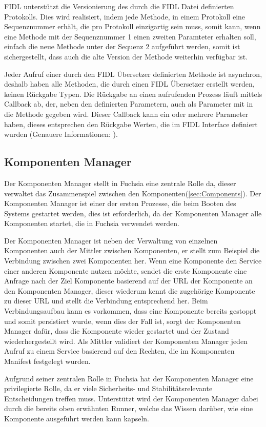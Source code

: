 \documentclass[a4paper]{scrartcl}
\begin{document}
FIDL unterstützt die Versionierung des durch die FIDL Datei definierten Protokolls. Dies wird realisiert, indem jede Methode, in einem Protokoll eine Sequenznummer erhält, die pro Protokoll einzigartig sein muss, somit kann, wenn eine Methode mit der Sequenznummer 1 einen zweiten Paramteter erhalten soll, einfach die neue Methode unter der Sequenz 2 aufgeführt werden, somit ist sichergestellt, dass auch die alte Version der Methode weiterhin verfügbar ist. \cite{Fuchsia.FIDL.Tutorial}

Jeder Aufruf einer durch den FIDL Übersetzer definierten Methode ist asynchron, deshalb haben alle Methoden, die durch einen FIDL Übersetzer erstellt werden, keinen Rückgabe Typen. Die Rückgabe an einen aufrufenden Prozess läuft mittels Callback ab, der, neben den definierten Parametern, auch als Parameter mit in die Methode gegeben wird. Dieser Callback kann ein oder mehrere Parameter haben, dieses entsprechen den Rückgabe Werten, die im FIDL Interface definiert wurden (Genauere Informationen: \cite{Fuchsia.FIDL.Tutorial}).
\subsection{Komponenten Manager}
Der Komponenten Manager stellt in Fuchsia eine zentrale Rolle da, dieser verwaltet das Zusammenspiel zwischen den Komponenten(\ref{sec:Components}). Der Komponenten Manager ist einer der ersten Prozesse, die beim Booten des Systems gestartet werden, dies ist erforderlich, da der Komponenten Manager alle Komponenten startet, die in Fuchsia verwendet werden.

Der Komponenten Manager ist neben der Verwaltung von einzelnen Komponenten auch der Mittler zwischen Komponenten, er stellt zum Beispiel die Verbindung zwischen zwei Komponenten her. Wenn eine Komponente den Service einer anderen Komponente nutzen möchte, sendet die erste Komponente eine Anfrage nach der Ziel Komponente basierend auf der URL der Komponente an den Komponenten Manager, dieser wiederum kennt die zugehörige Komponente zu dieser URL und stellt die Verbindung entsprechend her. Beim Verbindungsaufbau kann es vorkommen, dass eine Komponente bereits gestoppt und somit persistiert wurde, wenn dies der Fall ist, sorgt der Komponenten Manager dafür, dass die Komponente wieder gestartet und der Zustand wiederhergestellt wird. Als Mittler validiert der Komponenten Manager jeden Aufruf zu einem Service basierend auf den Rechten, die im Komponenten Manifest festgelegt wurden.

Aufgrund seiner zentralen Rolle in Fuchsia hat der Komponenten Manager eine privilegierte Rolle, da er viele Sicherheits- und Stabilitätsrelevante Entscheidungen treffen muss. Unterstützt wird der Komponenten Manager dabei durch die bereits oben erwähnten Runner, welche das Wissen darüber, wie eine Komponente ausgeführt werden kann kapseln.
\end{document}
